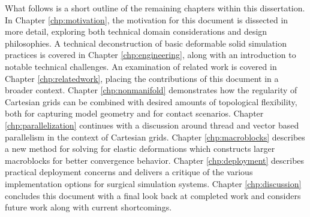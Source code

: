 What follows is a short outline of the remaining chapters within this
dissertation. In Chapter \ref{chp:motivation}, the motivation for this
document is dissected in more detail, exploring both technical domain
considerations and design philosophies.  A technical deconstruction of
basic deformable solid simulation practices is covered in Chapter
\ref{chp:engineering}, along with an introduction to notable technical
challenges.  An examination of related work is covered in Chapter
\ref{chp:relatedwork}, placing the contributions of this document in a
broader context.  Chapter \ref{chp:nonmanifold} demonstrates how the
regularity of Cartesian grids can be combined with desired amounts of
topological flexibility, both for capturing model geometry and for
contact scenarios.  Chapter \ref{chp:parallelization} continues with a
discussion around thread and vector based parallelism in the context
of Cartesian grids.  Chapter \ref{chp:macroblocks} describes a new
method for solving for elastic deformations which constructs larger
macroblocks for better convergence behavior.  Chapter \ref{chp:deployment}
describes practical deployment concerns and delivers a critique of the
various implementation options for surgical simulation systems.
Chapter \ref{chp:discussion} concludes this document with a final look
back at completed work and considers future work along with current
shortcomings.


